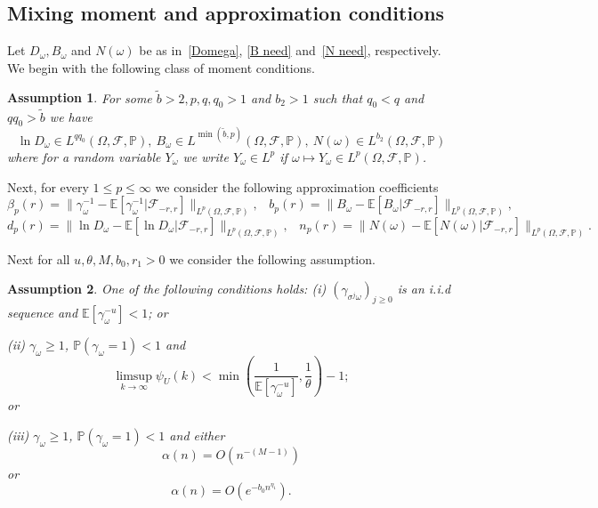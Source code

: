 \documentclass[11pt,reqno,a4paper]{article}
\newtheorem{assumption}{Assumption}
\theoremstyle{special}
\def\om{\omega}
\begin{document}
\subsection{Mixing moment and approximation conditions}\label{MixMom}
Let $D_\om, B_\om$ and $N(\om)$ be as in~\eqref{Domega}, \eqref{B need} and~\eqref{N need}, respectively.
We begin with the following class of moment conditions.
\begin{assumption}\label{Mom Ass}
For some $\tilde b>2, p,q,q_0>1$ and $b_2>1$ such that $q_0<q$ and $qq_0>\tilde b$ we have 
$$
\ln D_\om\in L^{qq_0}(\Omega,\mathcal F,\mathbb P), \  B_\om\in L^{\min(\tilde b,p)}(\Omega,\mathcal F,\mathbb P), \ N(\om)\in L^{b_2}(\Omega,\mathcal F,\mathbb P)
$$
where for a random variable $Y_\om$ we write $Y_\om\in L^p$ if $\om\mapsto Y_\om\in L^p(\Omega,\mathcal F,\mathbb P)$. 
\end{assumption}
Next, for every $1\leq p\leq \infty$ we consider the following approximation coefficients
$$
\beta_{p}(r)=\|\gamma_{\om}^{-1}-\mathbb E[\gamma_{\om}^{-1}|\mathcal F_{-r,r}]\|_{L^p(\Omega,\mathcal F,\mathbb P)}, \,\,\,\,\,b_p(r)=\|B_\om-\mathbb E[B_\om|\mathcal F_{-r,r}]\|_{L^p(\Omega,\mathcal F,\mathbb P)},
$$
$$
d_p(r)=\|\ln D_\om-\mathbb E[\ln D_\om|\mathcal F_{-r,r}]\|_{L^p(\Omega,\mathcal F,\mathbb P)},\,\,\,\,\,
n_p(r)=\|N(\om)-\mathbb E[N(\om)|\mathcal F_{-r,r}]\|_{L^p(\Omega,\mathcal F,\mathbb P)}.
$$



Next for all $u,\theta,M,b_0,r_1>0$ we  consider the following assumption.
\begin{assumption}\label{Ass A u}
One of the following conditions holds:
\vskip0.1cm
(i) $(\gamma_{\sigma^j\om})_{j\geq 0}$ is an i.i.d sequence and $\mathbb E[\gamma_\om^{-u}]<1$;
\vskip0.2cm
or
\vskip0.2cm

(ii) $\gamma_\om\geq 1$, $\mathbb P(\gamma_\om=1)<1$ and 
\begin{equation}\label{psi limsup}
\limsup_{k\to\infty}\psi_U(k)<\min\left(\frac{1}{\mathbb E[\gamma_\om^{- u}]}, \frac 1{\theta}\right)-1;    
\end{equation}
or 

(iii) $\gamma_\om\geq 1$, $\mathbb P(\gamma_\om=1)<1$ and either
\begin{equation}\label{al 1}
\alpha(n)=O(n^{-(M-1)})    
\end{equation}
or 
\begin{equation}\label{al 2}
\alpha(n)=O(e^{-b_0n^{\eta_1}}).    
\end{equation}

\end{assumption}
\end{document}
